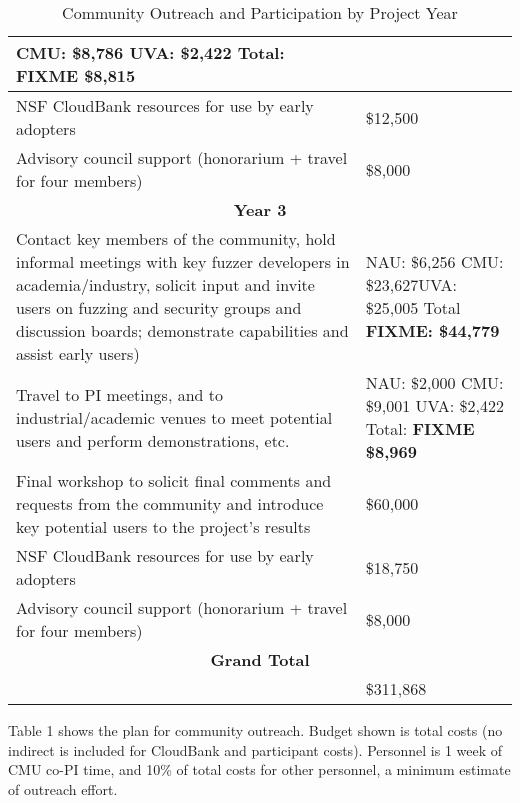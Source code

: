 \documentclass[12pt]{article}
\begin{document}
\begin{table}
\begin{tabular}{|p{12cm}|p{3cm}|}
                                                       CMU: \$8,786
                                                       UVA:  \$2,422
                                                       Total: \textbf{FIXME \$8,815}\\
    \hline
    NSF CloudBank resources for use by early adopters & \$12,500 \\
    \hline 
    Advisory council support (honorarium + travel for four members) & \$8,000 \\    
    \hline
    \hline
    \multicolumn{2}{c}{{\bf Year 3}} \\
    \hline
    \hline
   Contact key members of the community, hold informal meetings with
    key fuzzer developers in academia/industry, solicit input and
    invite users
    on fuzzing and security groups and discussion boards; demonstrate
    capabilities and assist early users) &  NAU:  \$6,256 CMU: \$23,627UVA: \$25,005
                                                      Total \textbf{FIXME:  \$44,779} \\
    \hline
    Travel to PI meetings, and to industrial/academic venues to meet
    potential users and perform demonstrations, etc. & NAU: \$2,000
                                                       CMU: \$9,001
                                                       UVA:  \$2,422
                                                       Total: \textbf{FIXME \$8,969}\\
    \hline    
    Final workshop to solicit final comments and requests from the
    community and introduce key potential users to the project’s
    results & \$60,000 \\
    \hline
    NSF CloudBank resources for use by early adopters & \$18,750 \\
    \hline 
    Advisory council support (honorarium + travel for four members) & \$8,000 \\    
    \hline
    \hline
    \multicolumn{2}{c}{{\bf Grand Total}} \\
    \hline
                   &     \$311,868 \\
                     \hline
 
  \end{tabular}
\label{outreach}
  \caption{Community Outreach and Participation by Project Year}
  
\end{table}


Table 1 shows the plan for community
outreach.   Budget shown is total costs 
 (no indirect is included for CloudBank and participant costs).   Personnel is 1 week of CMU co-PI time, and 10\%
of total costs for other personnel, a
minimum estimate of outreach effort.
\end{document}
